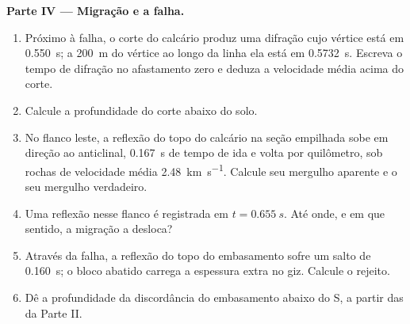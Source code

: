 \begin{problem}
\noindent\textbf{Parte IV --- Migração e a falha.}
\begin{enumerate}[resume]
  \item Próximo à falha, o corte do calcário produz uma difração
        cujo vértice está em \qty{0.550}{s}; a \qty{200}{m} do vértice ao longo da linha
        ela está em \qty{0.5732}{s}. Escreva o tempo de difração no afastamento zero e
        deduza a velocidade média acima do corte.
  \item Calcule a profundidade do corte abaixo do solo.
  \item No flanco leste, a reflexão do topo do calcário na seção empilhada
        sobe em direção ao anticlinal, \qty{0.167}{s} de tempo de ida e volta por
        quilômetro, sob rochas de velocidade média \qty{2.48}{km.s^{-1}}. Calcule seu
        mergulho aparente e o seu mergulho verdadeiro.
  \item Uma reflexão nesse flanco é registrada em $t = \qty{0.655}{s}$. Até onde,
        e em que sentido, a migração a desloca?
  \item Através da falha, a reflexão do topo do embasamento sofre um salto de \qty{0.160}{s};
        o bloco abatido carrega a espessura extra no giz. Calcule o
        rejeito.
  \item Dê a profundidade da discordância do embasamento abaixo do  S, a partir das
         da Parte II.
\end{enumerate}
\end{problem}
